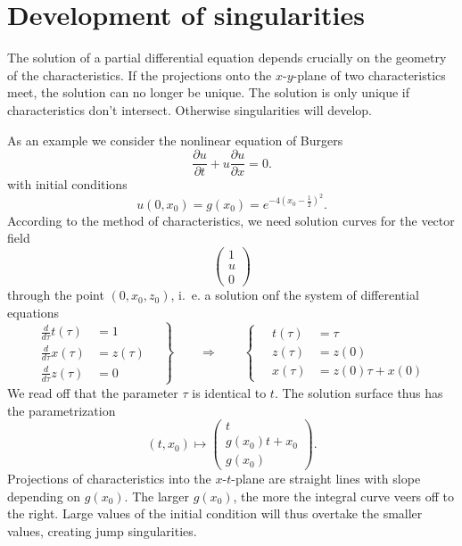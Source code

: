 %
%
%
\section{Development of singularities}
The solution of a partial differential equation depends crucially
on the geometry of the characteristics.
If the projections onto the $x$-$y$-plane of two characteristics 
meet, the solution can no longer be unique.
The solution is only unique if characteristics don't intersect.
Otherwise singularities will develop.

As an example we consider the nonlinear equation of Burgers
\begin{equation}
\frac{\partial u}{\partial t}+u\frac{\partial u}{\partial x}=0.
\label{wellenichtlinear}
\end{equation}
with initial conditions
\[
u(0,x_0)=g(x_0)=e^{-4(x_0-\frac12)^2}.
\]
According to the method of characteristics, we need solution curves for the
vector field
\[
\begin{pmatrix}
1\\
u\\
0
\end{pmatrix}
\]
through the point
$(0,x_0, z_0)$,
i.~e. a solution onf the system of differential equations
\[
\left.
\begin{aligned}
\frac{d}{d\tau} t(\tau)&=1\\
\frac{d}{d\tau} x(\tau)&=z(\tau)\\
\frac{d}{d\tau} z(\tau)&=0
\end{aligned}
\quad
\right\}
\qquad
\Rightarrow
\qquad
\left\{
\quad
\begin{aligned}
t(\tau)&=\tau\\
z(\tau)&=z(0)\\
x(\tau)&=z(0)\tau +x(0)
\end{aligned}
\right.
\]
We read off that the parameter $\tau$ 
is identical to $t$.
The solution surface thus has the parametrization
\[
(t,x_0)\mapsto
\begin{pmatrix}
t\\
g(x_0)t+x_0\\
g(x_0)
\end{pmatrix}.
\]
Projections of characteristics into the $x$-$t$-plane are straight
lines with slope depending on $g(x_0)$.
The larger $g(x_0)$, the more the integral curve veers off to the right.
Large values of the initial condition will thus overtake the smaller
values, creating jump singularities.

